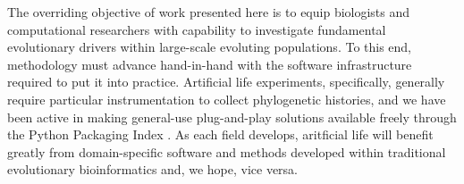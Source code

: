 The overriding objective of work presented here is to equip biologists and computational researchers with capability to investigate fundamental evolutionary drivers within large-scale evoluting populations.
To this end, methodology must advance hand-in-hand with the software infrastructure required to put it into practice.
Artificial life experiments, specifically, generally require particular instrumentation to collect phylogenetic histories, and we have been active in making general-use plug-and-play solutions available freely through the Python Packaging Index \citep{moreno2022hstrat,dolson2024phylotrackpy}.
As each field develops, aritficial life will benefit greatly from domain-specific software and methods developed within traditional evolutionary bioinformatics and, we hope, vice versa.








